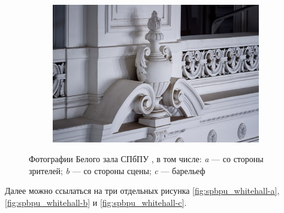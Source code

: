 \begin{figure}[!htbp]
	\begin{subfigure}[t]{\dimexpr.3\linewidth-1.3em\relax}
		\centering
		\includegraphics[width=.95\linewidth,valign=t]{my_folder/images//spbpu_whitehall_sculpture}
	\end{subfigure}%
\captionsetup{justification=centering} %
	\caption{Фотографии Белого зала СПбПУ \cite{spbpu-gallery}, в том числе: {\itshape a} --- со стороны зрителей; {\itshape b} --- со стороны сцены; {\itshape c} --- барельеф}\label{fig:spbpu_whitehall-three-photos}  
\end{figure}

Далее можно ссылаться на три отдельных рисунка \ref{fig:spbpu_whitehall-a}, \ref{fig:spbpu_whitehall-b} и \ref{fig:spbpu_whitehall-c}.